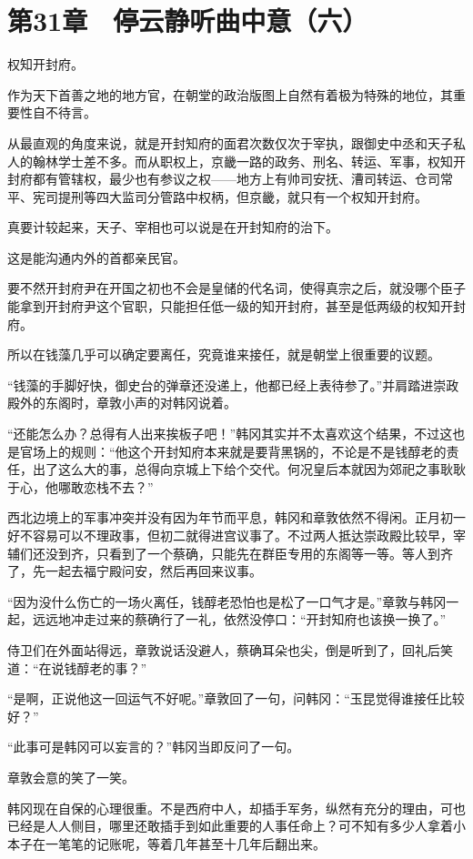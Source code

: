 \section{第31章　停云静听曲中意（六）}

权知开封府。

作为天下首善之地的地方官，在朝堂的政治版图上自然有着极为特殊的地位，其重要性自不待言。

从最直观的角度来说，就是开封知府的面君次数仅次于宰执，跟御史中丞和天子私人的翰林学士差不多。而从职权上，京畿一路的政务、刑名、转运、军事，权知开封府都有管辖权，最少也有参议之权——地方上有帅司安抚、漕司转运、仓司常平、宪司提刑等四大监司分管路中权柄，但京畿，就只有一个权知开封府。

真要计较起来，天子、宰相也可以说是在开封知府的治下。

这是能沟通内外的首都亲民官。

要不然开封府尹在开国之初也不会是皇储的代名词，使得真宗之后，就没哪个臣子能拿到开封府尹这个官职，只能担任低一级的知开封府，甚至是低两级的权知开封府。

所以在钱藻几乎可以确定要离任，究竟谁来接任，就是朝堂上很重要的议题。

“钱藻的手脚好快，御史台的弹章还没递上，他都已经上表待参了。”并肩踏进崇政殿外的东阁时，章敦小声的对韩冈说着。

“还能怎么办？总得有人出来挨板子吧！”韩冈其实并不太喜欢这个结果，不过这也是官场上的规则：“他这个开封知府本来就是要背黑锅的，不论是不是钱醇老的责任，出了这么大的事，总得向京城上下给个交代。何况皇后本就因为郊祀之事耿耿于心，他哪敢恋栈不去？”

西北边境上的军事冲突并没有因为年节而平息，韩冈和章敦依然不得闲。正月初一好不容易可以不理政事，但初二就得进宫议事了。不过两人抵达崇政殿比较早，宰辅们还没到齐，只看到了一个蔡确，只能先在群臣专用的东阁等一等。等人到齐了，先一起去福宁殿问安，然后再回来议事。

“因为没什么伤亡的一场火离任，钱醇老恐怕也是松了一口气才是。”章敦与韩冈一起，远远地冲走过来的蔡确行了一礼，依然没停口：“开封知府也该换一换了。”

侍卫们在外面站得远，章敦说话没避人，蔡确耳朵也尖，倒是听到了，回礼后笑道：“在说钱醇老的事？”

“是啊，正说他这一回运气不好呢。”章敦回了一句，问韩冈：“玉昆觉得谁接任比较好？”

“此事可是韩冈可以妄言的？”韩冈当即反问了一句。

章敦会意的笑了一笑。

韩冈现在自保的心理很重。不是西府中人，却插手军务，纵然有充分的理由，可也已经是人人侧目，哪里还敢插手到如此重要的人事任命上？可不知有多少人拿着小本子在一笔笔的记账呢，等着几年甚至十几年后翻出来。

